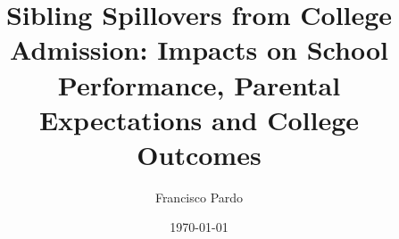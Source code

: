 
\title{Sibling Spillovers from College Admission: Impacts on School Performance, Parental Expectations and College Outcomes} %
\author{
	Francisco Pardo \\
}
\date{\today}
\JEL{}
\Keywords{}